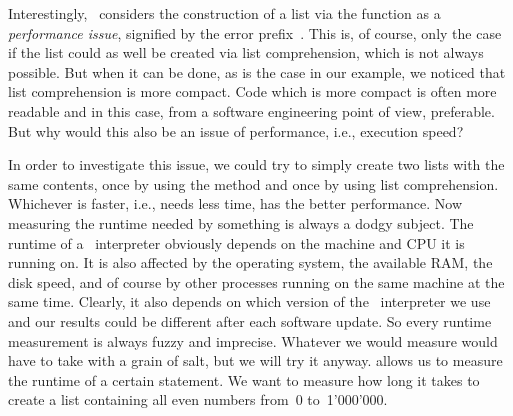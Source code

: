 Interestingly, \ruff\ considers the construction of a list via the  function as a \emph{performance issue}, signified by the error prefix~.
This is, of course, only the case if the list could as well be created via list comprehension, which is not always possible.
But when it can be done, as is the case in our example, we noticed that list comprehension is more compact.
Code which is more compact is often more readable and in this case, from a software engineering point of view, preferable.
But why would this also be an issue of performance, i.e., execution speed?

%
%
%
%
%

In order to investigate this issue, we could try to simply create two lists with the same contents, once by using the  method and once by using list comprehension.
Whichever is faster, i.e., needs less time, has the better performance.
Now measuring the runtime needed by something is always a dodgy subject.
The runtime of a \python\ interpreter obviously depends on the machine and CPU it is running on.
It is also affected by the operating system, the available RAM, the disk speed, and of course by other processes running on the same machine at the same time.
Clearly, it also depends on which version of the \python\ interpreter we use and our results could be different after each software update.
So every runtime measurement is always fuzzy and imprecise.
Whatever we would measure would have to take with a grain of salt, but we will try it anyway.%
%
%
%
 allows us to measure the runtime of a certain statement.
We want to measure how long it takes to create a list containing all even numbers from~0 to~1'000'000.

